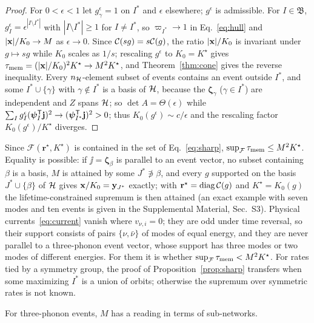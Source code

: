 \begin{proof}
For $0<\epsilon<1$ let $g^\epsilon_\gamma=1$ on $I^\ast$ and $\epsilon$ elsewhere; $g^\epsilon$ is
admissible. For $I\in\mathfrak B$, $g^\epsilon_I=\epsilon^{|I\setminus I^\ast|}$ with
$|I\setminus I^\ast|\ge1$ for $I\ne I^\ast$, so $\varpi_{I^\ast}\to1$ in Eq.~\eqref{eq:hull} and
$|\mathbf x|/K_0\to M$ as $\epsilon\to0$. Since $\mathcal C(sg)=s\mathcal C(g)$, the ratio $|\mathbf x|/K_0$ is invariant under
$g\mapsto sg$ while $K_0$ scales as $1/s$; rescaling $g^\epsilon$ to $K_0=K^\star$ gives
$\tau_{\rm mem}=(|\mathbf x|/K_0)^2K^\star\to M^2K^\star$, and Theorem~\ref{thm:cone} gives the reverse inequality.
Every $n_{\mathcal H}$-element subset of events contains an event outside $I^\ast$, and some $I^\ast\cup\{\gamma\}$
with $\gamma\notin I^\ast$ is a basis of $\mathcal H$, because the $\bm\zeta_\gamma$ ($\gamma\in I^\ast$) are
independent and $Z$ spans $\mathcal H$; so $\det A=\Theta(\epsilon)$ while
$\sum_Ig^\epsilon_I(\bm\psi_I^{\mathsf T}\mathbf j)^2\to(\bm\psi_{I^\ast}^{\mathsf T}\mathbf j)^2>0$; thus $K_0(g^\epsilon)\sim c/\epsilon$
and the rescaling factor $K_0(g^\epsilon)/K^\star$ diverges.
\end{proof}

\begin{remark}\label{rem:lifetimes}
Since $\mathcal F(\mathbf r^\star,K^\star)$ is contained in the set of Eq.~\eqref{eq:sharp},
$\sup_{\mathcal F}\tau_{\rm mem}\le M^2K^\star$. Equality is possible: if $\jj=\bm\zeta_\beta$ is parallel to an
event vector, no subset containing $\beta$ is a basis, $M$ is attained by some $J^\ast\not\ni\beta$, and
every $g$ supported on the basis $J^\ast\cup\{\beta\}$ of $\mathcal H$ gives $\mathbf x/K_0=\mathbf y_{J^\ast}$ exactly; with
$\mathbf r^\star=\mathrm{diag}\,\mathcal C(g)$ and $K^\star=K_0(g)$ the lifetime-constrained supremum is then
attained (an exact example with seven modes and ten events is given in the Supplemental Material,
Sec.~S3). Physical currents~\eqref{eq:current} vanish where $v_{\nu,i}=0$; they are odd under time
reversal, so their support consists of pairs $\{\nu,\bar\nu\}$ of modes of equal energy, and they are never
parallel to a three-phonon event vector, whose support has three modes or two modes of different energies.
For them it is  whether $\sup_{\mathcal F}\tau_{\rm mem}<M^2K^\star$. For rates tied by a symmetry
group, the proof of Proposition~\ref{prop:sharp} transfers when some maximizing $I^\ast$ is a union of
orbits; otherwise the supremum over symmetric rates is not known.
\end{remark}

For three-phonon events, $M$ has a reading in terms of sub-networks.

